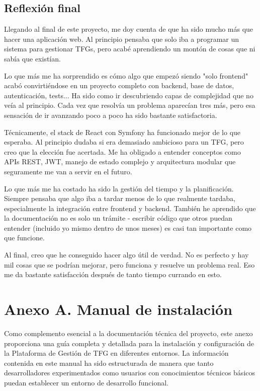 \documentclass[12pt,a4paper,oneside]{report}
\begin{document}
{\section{Reflexión final}\label{reflexiuxf3n-final}

Llegando al final de este proyecto, me doy cuenta de que ha sido mucho más que hacer una aplicación web. Al principio pensaba que solo iba a programar un sistema para gestionar TFGs, pero acabé aprendiendo un montón de cosas que ni sabía que existían.

Lo que más me ha sorprendido es cómo algo que empezó siendo "solo frontend" acabó convirtiéndose en un proyecto completo con backend, base de datos, autenticación, tests... Ha sido como ir descubriendo capas de complejidad que no veía al principio. Cada vez que resolvía un problema aparecían tres más, pero esa sensación de ir avanzando poco a poco ha sido bastante satisfactoria.

Técnicamente, el stack de React con Symfony ha funcionado mejor de lo que esperaba. Al principio dudaba si era demasiado ambicioso para un TFG, pero creo que la elección fue acertada. Me ha obligado a entender conceptos como APIs REST, JWT, manejo de estado complejo y arquitectura modular que seguramente me van a servir en el futuro.

Lo que más me ha costado ha sido la gestión del tiempo y la planificación. Siempre pensaba que algo iba a tardar menos de lo que realmente tardaba, especialmente la integración entre frontend y backend. También he aprendido que la documentación no es solo un trámite - escribir código que otros puedan entender (incluido yo mismo dentro de unos meses) es casi tan importante como que funcione.

Al final, creo que he conseguido hacer algo útil de verdad. No es perfecto y hay mil cosas que se podrían mejorar, pero funciona y resuelve un problema real. Eso me da bastante satisfacción después de tanto tiempo currando en esto.

\chapter{Anexo A. Manual de
instalación}\label{anexo-a.-manual-de-instalaciuxf3n}
Como complemento esencial a la documentación técnica del proyecto, este
anexo proporciona una guía completa y detallada para la instalación y
configuración de la Plataforma de Gestión de TFG en diferentes entornos.
La información contenida en este manual ha sido estructurada de manera
que tanto desarrolladores experimentados como usuarios con conocimientos
técnicos básicos puedan establecer un entorno de desarrollo funcional.

}
\end{document}
